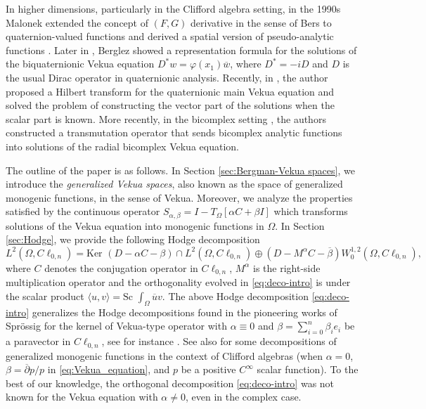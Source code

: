 \documentclass[12pt]{article}
\begin{document}
In higher dimensions, particularly in the Clifford algebra setting, in the 1990s Malonek extended the concept of $(F, G)$ derivative in the sense of Bers to quaternion-valued functions and derived a spatial version of pseudo-analytic functions \cite{Malonek1996,Malonek1998}. Later in \cite{Berglez2008}, Berglez showed a representation formula for the solutions of the biquaternionic Vekua equation $D^*w=\varphi(x_1)\overline{w}$, where $D^*=-iD$ and $D$ is the usual Dirac operator in quaternionic analysis. Recently, in \cite{DelPor2017, DelPor2018}, the author proposed a Hilbert transform for the quaternionic main Vekua equation and solved the problem of constructing the vector part of the solutions when the scalar part is known. More recently, in the bicomplex setting \cite{VictorRadial, radial2024}, the authors constructed a transmutation operator that sends bicomplex analytic functions into solutions of the radial bicomplex Vekua equation.

The outline of the paper is as follows. In Section \ref{sec:Bergman-Vekua spaces}, we introduce the \textit{generalized Vekua spaces}, also known as the space of generalized monogenic functions, in the sense of Vekua. Moreover, we analyze the properties satisfied by the continuous operator $S_{\alpha, \beta}=I-T_{\Omega}[\alpha C+\beta I]$ which transforms solutions of the Vekua equation into monogenic functions in $\Omega$.
In Section \ref{sec:Hodge}, we provide the following Hodge decomposition
\begin{equation}\label{eq:deco-intro}
   L^2(\Omega,C\ell_{0,n})=\text{Ker } (D-\alpha C-\beta)\cap L^2(\Omega,C\ell_{0,n})\oplus (D-M^{\alpha}C-\overline{\beta}) W_0^{1,2}(\Omega,C\ell_{0,n}),
\end{equation}
where $C$ denotes the conjugation operator in $C\ell_{0,n}$, $M^{\alpha}$ is the right-side multiplication operator and the orthogonality evolved in \eqref{eq:deco-intro} is under the scalar product $\langle u,v\rangle=\text{Sc }\int_{\Omega}\overline{u}v$. 
The above Hodge decomposition \eqref{eq:deco-intro} generalizes the Hodge decompositions found in the pioneering works of Spr\"{o}ssig for the kernel of Vekua-type operator with $\alpha\equiv 0$ and $\beta=\sum_{i=0}^n \beta_ie_i$ be a paravector in $C\ell_{0,n}$, see for instance \cite{Sprossig1995, Sprossig2001}. See also \cite{Sprossig1993} for some decompositions of generalized monogenic functions in the context of Clifford algebras (when $\alpha=0$,  $\beta=\overline{\partial} p/p$ in \eqref{eq:Vekua_equation}, and $p$ be a positive $C^{\infty}$ scalar function).
To the best of our knowledge, the orthogonal decomposition \eqref{eq:deco-intro} was not known for the Vekua equation with $\alpha\ne 0$, even in the complex case. 
\end{document}

